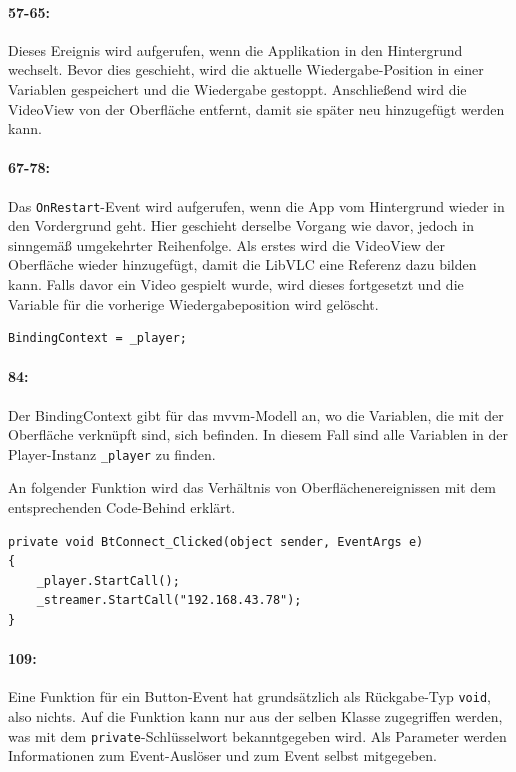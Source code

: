 \paragraph{57-65:} Dieses Ereignis wird aufgerufen, wenn die Applikation in den Hintergrund wechselt.
Bevor dies geschieht, wird die aktuelle Wiedergabe-Position in einer Variablen gespeichert und die Wiedergabe gestoppt.
Anschließend wird die VideoView von der Oberfläche entfernt, damit sie später neu hinzugefügt werden kann.
\paragraph{67-78:} Das \texttt{OnRestart}-Event wird aufgerufen, wenn die App vom Hintergrund wieder in den Vordergrund geht.
Hier geschieht derselbe Vorgang wie davor, jedoch in sinngemäß umgekehrter Reihenfolge.
Als erstes wird die VideoView der Oberfläche wieder hinzugefügt, damit die LibVLC eine Referenz dazu bilden kann.
Falls davor ein Video gespielt wurde, wird dieses fortgesetzt und die Variable für die vorherige Wiedergabeposition wird gelöscht.

\begin{verbatim}
BindingContext = _player;
\end{verbatim}
\paragraph{84:} Der BindingContext gibt für das \ac{mvvm}-Modell an, wo die Variablen, die mit der Oberfläche verknüpft sind, sich befinden.
In diesem Fall sind alle Variablen in der Player-Instanz \texttt{\_player} zu finden.

An folgender Funktion wird das Verhältnis von Oberflächenereignissen mit dem entsprechenden Code-Behind erklärt.
\begin{verbatim}
private void BtConnect_Clicked(object sender, EventArgs e)
{
    _player.StartCall();
    _streamer.StartCall("192.168.43.78");
}
\end{verbatim}
\paragraph{109:} Eine Funktion für ein Button-Event hat grundsätzlich als Rückgabe-Typ \texttt{void}, also nichts.
Auf die Funktion kann nur aus der selben Klasse zugegriffen werden, was mit dem \texttt{private}-Schlüsselwort bekanntgegeben wird.
Als Parameter werden Informationen zum Event-Auslöser und zum Event selbst mitgegeben.

